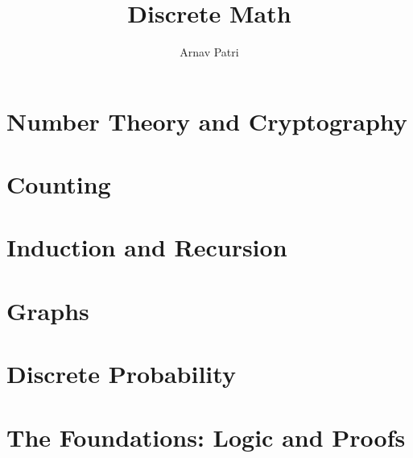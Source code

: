 \documentclass[12pt, A4]{report}
\title{Discrete Math}
\author{Arnav Patri}
\begin{document}
	\maketitle
	\tableofcontents
	\setcounter{chapter}{3}
	\chapter{Number Theory and Cryptography}
		
	\setcounter{chapter}{5}
	\chapter{Counting}
		
	\setcounter{chapter}{4}
	\chapter{Induction and Recursion}
		
	\setcounter{chapter}{9}
	\chapter{Graphs}
		
	\chapter{Discrete Probability}
		
	\setcounter{chapter}{1}
	\chapter{The Foundations: Logic and Proofs}
		
\end{document}
